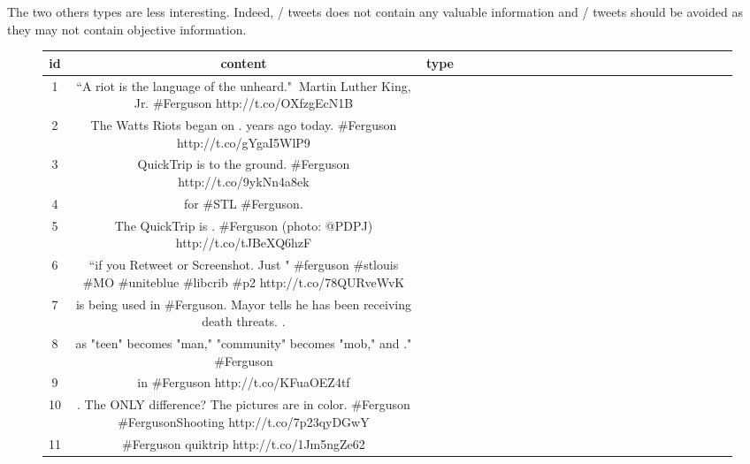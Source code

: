 \documentclass[a4paper,twoside,12pt,openright]{report}
\newcommand{\nl}{\tabularnewline\midrule}
\begin{document}
The two others types are less interesting. Indeed, / tweets does not contain any valuable information and / tweets should be avoided as they may not contain objective information.

\begin{figure}[h!]
\centering
\begin{tabular}{c|Cp{3cm}}
id & content & type \nl
1 & ``A riot is the language of the unheard." $~$Martin Luther King, Jr. \#Ferguson http://t.co/OXfzgEcN1B &  \newline {} \nl
2 & The Watts Riots began on .   years ago today. \#Ferguson http://t.co/gYgaI5WlP9 &  \newline {} \nl
3 & QuickTrip is  to the ground. \#Ferguson http://t.co/9ykNn4a8ek &  \newline {} \nl
4 &  for \#STL \#Ferguson. &  \newline {} \nl
5 & The QuickTrip is  . \#Ferguson (photo: @PDPJ) http://t.co/tJBeXQ6hzF &  \newline {} \nl
6 & ``if you Retweet or Screenshot. Just  " \#ferguson \#stlouis \#MO  \#uniteblue \#libcrib \#p2 http://t.co/78QURveWvK &  \newline {}  \nl
7 &  is being used in \#Ferguson.  Mayor tells  he has been receiving death threats. . &  \newline {} \nl
8 &  as "teen" becomes "man," "community" becomes "mob," and ." \#Ferguson  &  \newline {} \nl
9 &  in \#Ferguson http://t.co/KFuaOEZ4tf &  \newline {} \nl
10 & . The ONLY difference?  The pictures are in color.  \#Ferguson \#FergusonShooting http://t.co/7p23qyDGwY &  \newline {} \nl
11 & \#Ferguson quiktrip  http://t.co/1Jm5ngZe62 &  \newline {} \nl

\end{tabular}
\end{figure}
\end{document}
